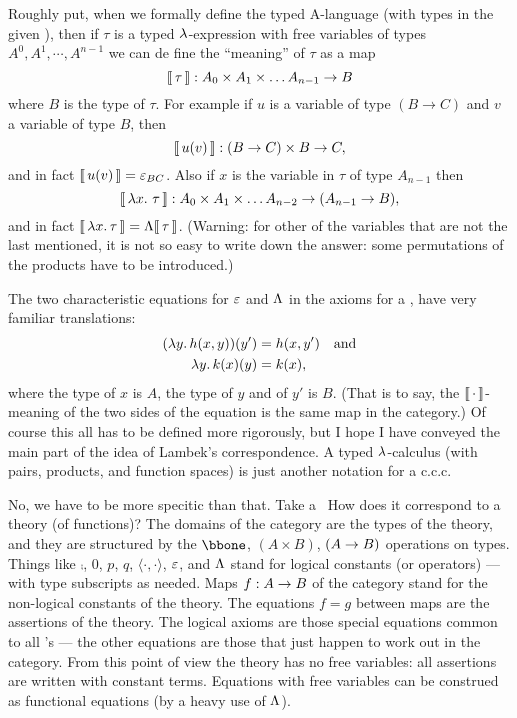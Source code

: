 Roughly put, when we formally define the typed A-language (with types in the given \ccc), then if $\tau$ is a typed $\lambda$-expression with free variables of types $A^0, A^1,\cdots, A^{n-1}$ we can de fine the ``meaning'' of $\tau$ as a map
%
$$
\llbracket\, \tau \,\rrbracket: A_0 \times A_1 \times \dots A_{n-1} \rightarrow B
$$
%
where $B$ is the type of $\tau$. For example if $u$ is a variable of type $(B \to C)$ and $v$ a variable of type $B$, then
$$
\llbracket\, u(v) \,\rrbracket: (B \rightarrow C) \times B \rightarrow C,
$$
%
and in fact $\llbracket\, u(v) \,\rrbracket = \varepsilon_{BC}$. Also if $x$ is the variable in $\tau$ of type $A_{n-1}$ then
$$
\means{\lm{x}.\, \tau}: A_0 \times A_1 \times \dots A_{n-2} \to (A_{n-1} \to B),
$$
%
and in fact $\llbracket\, \lambda x.\, \tau \,\rrbracket = \Lambda\llbracket\, \tau \,\rrbracket$. (Warning: for other of the variables that are not the last mentioned, it is not so easy to write down the answer: some permutations of the products have to be introduced.)

The two characteristic equations for $\varepsilon$ and $\Lambda$ in the axioms for a \ccc, have very familiar translations:
\begin{align*}
( \lm{y}. h(x,y))(y') &= h(x,y') \quad {\textrm {and}} \\
\lm{y}. k(x)(y) &= k(x),
\end{align*}
%
where the type of $x$ is $A$, the type of $y$ and of $y'$ is $B$. (That is to say, the $\llbracket\, \cdot \,\rrbracket$-meaning of the two sides of the equation is
the same map in the category.) Of course this all has to be defined more rigorously, but I hope I have conveyed the main part of the idea of Lambek's correspondence. A typed $\lambda$-calculus (with pairs, products, and function spaces) is just another notation for a {c.c.c}.

No, we have to be more specitic than that. Take a \ccc\ How does it correspond to a theory (of functions)? The domains
of the category are the types of the theory, and they are structured by the $\bbone$, $(A \times B)$, $(A \rightarrow B)$ operations on types. Things like $\comp$,
$0$, $p$, $q$, $\langle\cdot,\cdot\rangle$, $\varepsilon$, and $\Lambda$ stand for logical constants (or operators) --- with type subscripts as needed. Maps $f : A \rightarrow B$ of the category stand for the non-logical constants of the theory.
The equations $f = g$ between maps are the assertions of the theory. The logical axioms are those special equations common to all \ccc's --- the other equations are those that just happen to work out in the category. From this point of view the theory has no free variables: all assertions are written with constant terms. Equations with free variables can be construed as functional equations (by a heavy use of $\Lambda$).

